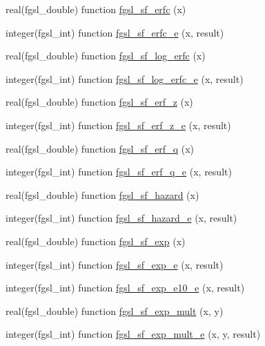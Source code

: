 \begin{DoxyCompactItemize}
\item 
real(fgsl\-\_\-double) function \hyperlink{specfunc_8finc_a14066e6dcb26748cffe3c3ea69ec2f35}{fgsl\-\_\-sf\-\_\-erfc} (x)
\item 
integer(fgsl\-\_\-int) function \hyperlink{specfunc_8finc_ab614e2480ee403c09e3220475ff4cdbd}{fgsl\-\_\-sf\-\_\-erfc\-\_\-e} (x, result)
\item 
real(fgsl\-\_\-double) function \hyperlink{specfunc_8finc_a3baa066f6192858ef58ad5f26a1719be}{fgsl\-\_\-sf\-\_\-log\-\_\-erfc} (x)
\item 
integer(fgsl\-\_\-int) function \hyperlink{specfunc_8finc_aba0192bba0eed7c77d0d6bd9bc1928b6}{fgsl\-\_\-sf\-\_\-log\-\_\-erfc\-\_\-e} (x, result)
\item 
real(fgsl\-\_\-double) function \hyperlink{specfunc_8finc_a095b336918f901f69eaca301fb143ace}{fgsl\-\_\-sf\-\_\-erf\-\_\-z} (x)
\item 
integer(fgsl\-\_\-int) function \hyperlink{specfunc_8finc_a85a48dea1aca3cacf4ecdc95d5d988e6}{fgsl\-\_\-sf\-\_\-erf\-\_\-z\-\_\-e} (x, result)
\item 
real(fgsl\-\_\-double) function \hyperlink{specfunc_8finc_a1b3c416f75498a3e96bd59bf0121ff45}{fgsl\-\_\-sf\-\_\-erf\-\_\-q} (x)
\item 
integer(fgsl\-\_\-int) function \hyperlink{specfunc_8finc_a269110d6eb74a848148b00764673225d}{fgsl\-\_\-sf\-\_\-erf\-\_\-q\-\_\-e} (x, result)
\item 
real(fgsl\-\_\-double) function \hyperlink{specfunc_8finc_a4bd454315927591d35336280b3ffc3d9}{fgsl\-\_\-sf\-\_\-hazard} (x)
\item 
integer(fgsl\-\_\-int) function \hyperlink{specfunc_8finc_a9cf498c10fe1a9fac6ae81e58d8fe620}{fgsl\-\_\-sf\-\_\-hazard\-\_\-e} (x, result)
\item 
real(fgsl\-\_\-double) function \hyperlink{specfunc_8finc_a043b6435a1861419db28f6e918e981d7}{fgsl\-\_\-sf\-\_\-exp} (x)
\item 
integer(fgsl\-\_\-int) function \hyperlink{specfunc_8finc_a7963c74fa729d05029c56d547d96990e}{fgsl\-\_\-sf\-\_\-exp\-\_\-e} (x, result)
\item 
integer(fgsl\-\_\-int) function \hyperlink{specfunc_8finc_a88816c6d5ff5472450226157f7c8f090}{fgsl\-\_\-sf\-\_\-exp\-\_\-e10\-\_\-e} (x, result)
\item 
real(fgsl\-\_\-double) function \hyperlink{specfunc_8finc_a089388c68bea55ad034bfbc8d250b3ad}{fgsl\-\_\-sf\-\_\-exp\-\_\-mult} (x, y)
\item 
integer(fgsl\-\_\-int) function \hyperlink{specfunc_8finc_a6e78d00e401f995d4d3365406c561b2f}{fgsl\-\_\-sf\-\_\-exp\-\_\-mult\-\_\-e} (x, y, result)

\end{DoxyCompactItemize}
